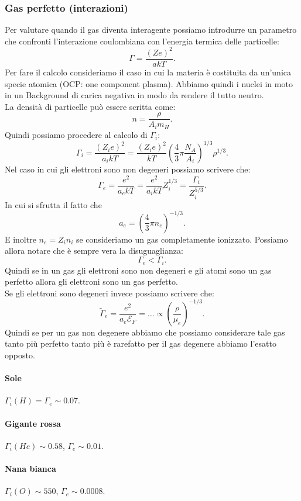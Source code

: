 \subsubsection{Gas perfetto (interazioni)}
\label{subsubsec:Gas perfetto (interazioni)}
Per valutare quando il gas diventa interagente possiamo introdurre un parametro che confronti l'interazione coulombiana con l'energia termica delle particelle:
\[
	\Gamma  = \frac{\left( Ze \right)^2}{akT}
.\] 
Per fare il calcolo consideriamo il caso in cui la materia è costituita da un'unica specie atomica (OCP: one component plasma). Abbiamo quindi i nuclei in moto in un Background di carica negativa in modo da rendere il tutto neutro.\\
La densità di particelle può essere scritta come:
\[
	n = \frac{\rho }{A_i m_H}
.\] 
Quindi possiamo procedere al calcolo di $\Gamma_i$:
\[
	\Gamma_i = \frac{\left( Z_ie \right) ^2}{a_ikT} 
	=
	\frac{\left( Z_i e \right)^2}{kT} \left( \frac{4}{3}\pi \frac{N_A}{A_i} \right)^{1/3} \rho ^{1/3}
.\] 
Nel caso in cui gli elettroni sono non degeneri possiamo scrivere che:
\[
	\Gamma_e = \frac{e^2}{a _e kT}
	=
	\frac{e^2}{a_i kT}Z_i^{1/3} = \frac{\Gamma_i}{Z_i^{5/3}}
.\] 
In cui si sfrutta il fatto che 
 \[
	 a_e = \left( \frac{4}{3}\pi n_e \right)^{-1/3}
.\] 
E inoltre $n_e = Z_i n_i$ se consideriamo un gas completamente ionizzato. Possiamo allora notare che è sempre vera la disuguaglianza:
 \[
	\Gamma_e < \Gamma_i
.\] 
Quindi se in un gas gli elettroni sono non degeneri e gli atomi sono un gas perfetto allora gli elettroni sono un gas perfetto.\\
Se gli elettroni sono degeneri invece possiamo scrivere che:
\[
	\tilde{\Gamma }_e = \frac{e^2}{a_e\mathcal{E}_F} = \ldots \propto \left( \frac{\rho }{\mu_e} \right)^{-1/3}
.\] 
Quindi se per un gas non degenere abbiamo che possiamo considerare tale gas tanto più perfetto tanto più è rarefatto per il gas degenere abbiamo l'esatto opposto.
\paragraph{Sole} $\Gamma_i(H) = \Gamma_e \sim 0.07$.
\paragraph{Gigante rossa} $\Gamma_i(He) \sim 0.58$, $\Gamma_e \sim 0.01$.
\paragraph{Nana bianca} $\Gamma_i(O) \sim 550$, $\Gamma_e\sim 0.0008$.

